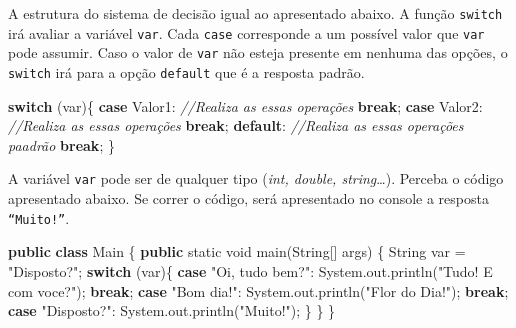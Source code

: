 \documentclass[
]{book}
\newenvironment{Shaded}{\begin{snugshade}}{\end{snugshade}}
\newcommand{\BuiltInTok}[1]{#1}
\newcommand{\CommentTok}[1]{\textcolor[rgb]{0.56,0.35,0.01}{\textit{#1}}}
\newcommand{\DataTypeTok}[1]{\textcolor[rgb]{0.13,0.29,0.53}{#1}}
\newcommand{\FunctionTok}[1]{\textcolor[rgb]{0.00,0.00,0.00}{#1}}
\newcommand{\KeywordTok}[1]{\textcolor[rgb]{0.13,0.29,0.53}{\textbf{#1}}}
\newcommand{\NormalTok}[1]{#1}
\newcommand{\StringTok}[1]{\textcolor[rgb]{0.31,0.60,0.02}{#1}}
\begin{document}
A estrutura do sistema de decisão igual ao apresentado abaixo. A função \texttt{switch} irá avaliar a variável \texttt{var}. Cada \texttt{case} corresponde a um possível valor que \texttt{var} pode assumir. Caso o valor de \texttt{var} não esteja presente em nenhuma das opções, o \texttt{switch} irá para a opção \texttt{default} que é a resposta padrão.

\begin{Shaded}
\begin{Highlighting}[]
\KeywordTok{switch}\NormalTok{ (var)\{}
    \KeywordTok{case}\NormalTok{ Valor1:}
        \CommentTok{//Realiza as essas operações}
        \KeywordTok{break}\NormalTok{;}
    \KeywordTok{case}\NormalTok{ Valor2:}
        \CommentTok{//Realiza as essas operações}
        \KeywordTok{break}\NormalTok{;}
    \KeywordTok{default}\NormalTok{:}
        \CommentTok{//Realiza as essas operações paadrão}
        \KeywordTok{break}\NormalTok{;}
\NormalTok{\}}
\end{Highlighting}
\end{Shaded}

A variável \texttt{var} pode ser de qualquer tipo (\emph{int, double, string}\ldots). Perceba o código apresentado abaixo. Se correr o código, será apresentado no console a resposta \texttt{“Muito!”}.

\begin{Shaded}
\begin{Highlighting}[]
\KeywordTok{public} \KeywordTok{class}\NormalTok{ Main \{}
    \KeywordTok{public} \DataTypeTok{static} \DataTypeTok{void} \FunctionTok{main}\NormalTok{(}\BuiltInTok{String}\NormalTok{[] args) \{}
        \BuiltInTok{String}\NormalTok{ var = }\StringTok{"Disposto?"}\NormalTok{;}
        \KeywordTok{switch}\NormalTok{ (var)\{}
            \KeywordTok{case} \StringTok{"Oi, tudo bem?"}\NormalTok{:}
                \BuiltInTok{System}\NormalTok{.}\FunctionTok{out}\NormalTok{.}\FunctionTok{println}\NormalTok{(}\StringTok{"Tudo! E com voce?"}\NormalTok{);}
                \KeywordTok{break}\NormalTok{;}
            \KeywordTok{case} \StringTok{"Bom dia!"}\NormalTok{:}
                \BuiltInTok{System}\NormalTok{.}\FunctionTok{out}\NormalTok{.}\FunctionTok{println}\NormalTok{(}\StringTok{"Flor do Dia!"}\NormalTok{);}
                \KeywordTok{break}\NormalTok{;}
            \KeywordTok{case} \StringTok{"Disposto?"}\NormalTok{:}
                \BuiltInTok{System}\NormalTok{.}\FunctionTok{out}\NormalTok{.}\FunctionTok{println}\NormalTok{(}\StringTok{"Muito!"}\NormalTok{);}
\NormalTok{        \}}
\NormalTok{    \}}
\NormalTok{\}}
\end{Highlighting}
\end{Shaded}
\end{document}
